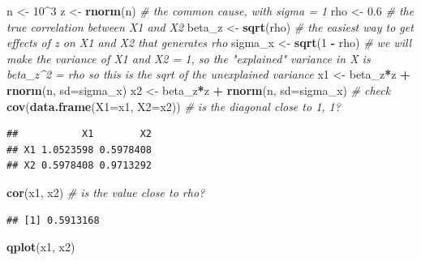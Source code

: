 \documentclass[]{book}
\newenvironment{Shaded}{\begin{snugshade}}{\end{snugshade}}
\newcommand{\KeywordTok}[1]{\textcolor[rgb]{0.13,0.29,0.53}{\textbf{#1}}}
\newcommand{\DataTypeTok}[1]{\textcolor[rgb]{0.13,0.29,0.53}{#1}}
\newcommand{\DecValTok}[1]{\textcolor[rgb]{0.00,0.00,0.81}{#1}}
\newcommand{\FloatTok}[1]{\textcolor[rgb]{0.00,0.00,0.81}{#1}}
\newcommand{\StringTok}[1]{\textcolor[rgb]{0.31,0.60,0.02}{#1}}
\newcommand{\CommentTok}[1]{\textcolor[rgb]{0.56,0.35,0.01}{\textit{#1}}}
\newcommand{\OperatorTok}[1]{\textcolor[rgb]{0.81,0.36,0.00}{\textbf{#1}}}
\newcommand{\NormalTok}[1]{#1}
\begin{document}
\begin{Shaded}
\begin{Highlighting}[]
\NormalTok{n <-}\StringTok{ }\DecValTok{10}\OperatorTok{^}\DecValTok{3}
\NormalTok{z <-}\StringTok{ }\KeywordTok{rnorm}\NormalTok{(n) }\CommentTok{# the common cause, with sigma = 1}
\NormalTok{rho <-}\StringTok{ }\FloatTok{0.6} \CommentTok{# the true correlation between X1 and X2}
\NormalTok{beta_z <-}\StringTok{ }\KeywordTok{sqrt}\NormalTok{(rho) }\CommentTok{# the easiest way to get effects of z on X1 and X2 that generates rho}
\NormalTok{sigma_x <-}\StringTok{ }\KeywordTok{sqrt}\NormalTok{(}\DecValTok{1} \OperatorTok{-}\StringTok{ }\NormalTok{rho) }\CommentTok{# we will make the variance of X1 and X2 = 1, so the "explained" variance in X is beta_z^2 = rho so this is the sqrt of the unexplained variance}
\NormalTok{x1 <-}\StringTok{ }\NormalTok{beta_z}\OperatorTok{*}\NormalTok{z }\OperatorTok{+}\StringTok{ }\KeywordTok{rnorm}\NormalTok{(n, }\DataTypeTok{sd=}\NormalTok{sigma_x)}
\NormalTok{x2 <-}\StringTok{ }\NormalTok{beta_z}\OperatorTok{*}\NormalTok{z }\OperatorTok{+}\StringTok{ }\KeywordTok{rnorm}\NormalTok{(n, }\DataTypeTok{sd=}\NormalTok{sigma_x)}
\CommentTok{# check}
\KeywordTok{cov}\NormalTok{(}\KeywordTok{data.frame}\NormalTok{(}\DataTypeTok{X1=}\NormalTok{x1, }\DataTypeTok{X2=}\NormalTok{x2)) }\CommentTok{# is the diagonal close to 1, 1?}
\end{Highlighting}
\end{Shaded}

\begin{verbatim}
##           X1        X2
## X1 1.0523598 0.5978408
## X2 0.5978408 0.9713292
\end{verbatim}

\begin{Shaded}
\begin{Highlighting}[]
\KeywordTok{cor}\NormalTok{(x1, x2) }\CommentTok{# is the value close to rho?}
\end{Highlighting}
\end{Shaded}

\begin{verbatim}
## [1] 0.5913168
\end{verbatim}

\begin{Shaded}
\begin{Highlighting}[]
\KeywordTok{qplot}\NormalTok{(x1, x2)}
\end{Highlighting}
\end{Shaded}
\end{document}

